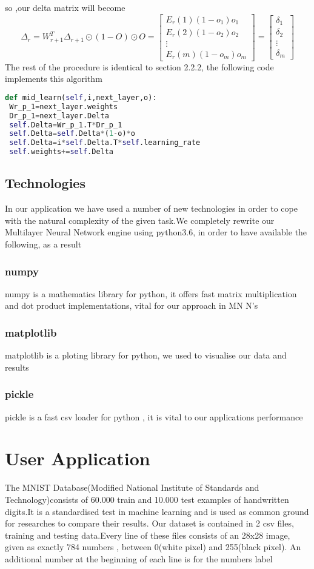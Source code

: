 \documentclass{proc}
\begin{document}
	so ,our delta matrix will become
	\[
	\Delta_r=
	W_{r+1}^T\Delta_{r+1}\odot(1-O)\odot O=
	\begin{bmatrix}
	E_r(1)(1-o_{1})o_{1}\\
	E_r(2)(1-o_{2})o_{2}\\
	\vdots\\
	E_r(m)(1-o_{m})o_{m}
	\end{bmatrix} 
	=
	\begin{bmatrix}
	\delta_1\\
	\delta_2\\
	\vdots\\
	\delta_m
	\end{bmatrix} 
	\]
	The rest of the procedure is identical to section 2.2.2, the following code implements this algorithm
	\begin{lstlisting}[language=Python]
def mid_learn(self,i,next_layer,o):
 Wr_p_1=next_layer.weights
 Dr_p_1=next_layer.Delta
 self.Delta=Wr_p_1.T*Dr_p_1
 self.Delta=self.Delta*(1-o)*o
 self.Delta=i*self.Delta.T*self.learning_rate
 self.weights+=self.Delta
	\end{lstlisting}
	\subsection{Technologies}
	In our application we have used a number of new technologies in order to cope with the natural complexity of the given task.We completely rewrite our Multilayer Neural Network engine using python3.6, in order to have available the following, as a result
	\subsubsection{numpy}
	numpy is a mathematics library for python, it offers fast matrix multiplication and dot product implementations, vital for our approach in MN N's
	\subsubsection{matplotlib}
	matplotlib is a ploting library for python, we used to visualise our data and results
	\subsubsection{pickle}
	pickle is a fast csv loader for python , it is vital to our applications performance
		
	\section{User Application}
	The MNIST Database(Modified National Institute of Standards and Technology)consists of 60.000 train and 10.000 test examples of handwritten digits.It is a standardised test in machine learning and is used as common ground for researches to compare their results.
	Our dataset is contained in 2 csv files, training and testing data.Every line of these files consists of an 28x28 image, given as exactly 784 numbers , between 0(white pixel) and 255(black pixel). An additional number at the beginning of each line is for the numbers label
\end{document}
